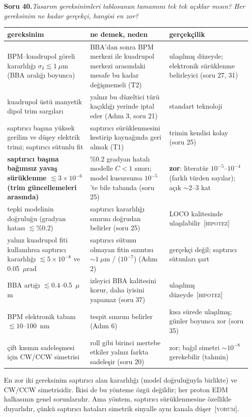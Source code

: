 \documentclass[11pt,a4paper]{article}
\newcommand{\YOR}{\textsc{[yorum]}}
\newcommand{\HIP}{\textsc{[hipotez]}}
\newcounter{soru}
\newcommand{\soru}[2]{%
  \par\medskip\noindent\textbf{Soru #1.}\enspace\textit{#2}\par\nopagebreak\smallskip}
\begin{document}
\soru{40}{Tasarım gereksinimleri tablosunun tamamını tek tek açıklar mısın? Her gereksinim ne kadar
gerçekçi, hangisi en zor?}

\begin{center}\small
\begin{tabularx}{\textwidth}{>{\raggedright\arraybackslash}p{4.2cm}>{\raggedright\arraybackslash}X>{\raggedright\arraybackslash}p{3.3cm}}
\toprule
gereksinim & ne demek, neden & gerçekçilik \\
\midrule
BPM--kuadrupol göreli kararlılığı $\sigma_\delta\lesssim1~\mu$m (BBA aralığı boyunca) & BBA'dan sonra BPM
merkezi ile kuadrupol merkezi arasındaki mesafe bu kadar değişmemeli (T2) & ulaşılmış düzeyde; elektronik
sürüklenme belirleyici (soru 27, 31) \\
\addlinespace
kuadrupol üstü manyetik dipol trim sargıları & yalnız bu düzeltici türü kaçıklığı yerinde iptal eder
(Adım 3, soru 21) & standart teknoloji \\
\addlinespace
saptırıcı başına yüksek gerilim ve düşey elektrik trimi; saptırıcı sütunlu fit & saptırıcı sürüklenmesini
kestirip kaynağında geri almak (T1) & trimin kendisi kolay (soru 25) \\
\addlinespace
\textbf{saptırıcı başına bağımsız yavaş sürüklenme $\lesssim3\times10^{-6}$ (trim güncellemeleri arasında)} &
\%0.2 gradyan hatalı modelle $C<1$ sınırı; model kusursuzsa $10^{-5}$'te bile tabanda (soru 25) &
\textbf{zor}: literatür $10^{-5}$--$10^{-4}$ (farklı türden sayılar); açık $\sim$2--3 kat \\
\addlinespace
tepki modelinin doğruluğu (gradyan hatası $\lesssim$\%0.2) & saptırıcı kararlılığı sınırını doğrudan
belirler (soru 25) & LOCO kalitesinde ulaşılabilir~\HIP \\
\addlinespace
yalnız kuadrupol fiti kullanılırsa saptırıcı kararlılığı $\lesssim5\times10^{-8}$ ve 0.05~$\mu$rad & saptırıcı
sütunu olmayan fitin sızıntısı $\sim1~\mu$m / ($10^{-7}$) (Adım 2) & gerçekçi değil; saptırıcı sütunları
şart \\
\addlinespace
BBA artığı $\lesssim0.4$--0.5~$\mu$m & izleyici BBA kalitesini korur, daha iyisini yapamaz (soru 37) &
ulaşılmış düzeyde~\HIP \\
\addlinespace
BPM elektronik tabanı $\lesssim10$--100~nm & tespit sınırını belirler (Adım 6) & kısa sürede ulaşılmış;
günler boyunca zor (soru 35) \\
\addlinespace
çift kısmın sadeleşmesi için CW/CCW simetrisi & roll gibi birinci mertebe etkiler yalnız farkta sadeleşir
(soru 20) & zor; bağıl simetri $\sim10^{-8}$ gerekebilir (tahmin) \\
\bottomrule
\end{tabularx}
\end{center}
En zor iki gereksinim saptırıcı alan kararlılığı (model doğruluğuyla birlikte) ve CW/CCW simetrisidir. İkisi de bu yönteme özgü değildir;
her proton EDM halkasının genel sorunlarıdır. Ama yöntem, saptırıcı sürüklenmesine özellikle duyarlıdır,
çünkü saptırıcı hataları simetrik sinyalle aynı kanala düşer~\YOR.
\end{document}
